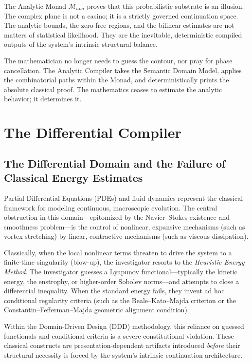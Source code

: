 \documentclass[12pt,openany]{extbook}
\theoremstyle{plain}
\theoremstyle{definition}
\begin{document}
The Analytic Monad $\mathcal{M}_{ana}$ proves that this probabilistic substrate is an illusion. The complex plane is not a casino; it is a strictly governed continuation space. The analytic bounds, the zero-free regions, and the bilinear estimates are not matters of statistical likelihood. They are the inevitable, deterministic compiled outputs of the system's intrinsic structural balance.

The mathematician no longer needs to guess the contour, nor pray for phase cancellation. The Analytic Compiler takes the Semantic Domain Model, applies the combinatorial paths within the Monad, and deterministically prints the absolute classical proof. The mathematics ceases to estimate the analytic behavior; it determines it.

\chapter{The Differential Compiler}

\section{The Differential Domain and the Failure of Classical Energy Estimates}

Partial Differential Equations (PDEs) and fluid dynamics represent the classical framework for modeling continuous, macroscopic evolution. The central obstruction in this domain—epitomized by the Navier--Stokes existence and smoothness problem—is the control of nonlinear, expansive mechanisms (such as vortex stretching) by linear, contractive mechanisms (such as viscous dissipation). 

Classically, when the local nonlinear terms threaten to drive the system to a finite-time singularity (blow-up), the investigator resorts to the \emph{Heuristic Energy Method}. The investigator guesses a Lyapunov functional—typically the kinetic energy, the enstrophy, or higher-order Sobolev norms—and attempts to close a differential inequality. When the standard energy fails, they invent ad hoc conditional regularity criteria (such as the Beale--Kato--Majda criterion or the Constantin--Fefferman--Majda geometric alignment condition). 

Within the Domain-Driven Design (DDD) methodology, this reliance on guessed functionals and conditional criteria is a severe constitutional violation. These classical constructs are presentation-dependent artifacts introduced \emph{before} their structural necessity is forced by the system's intrinsic continuation architecture. 
\end{document}
